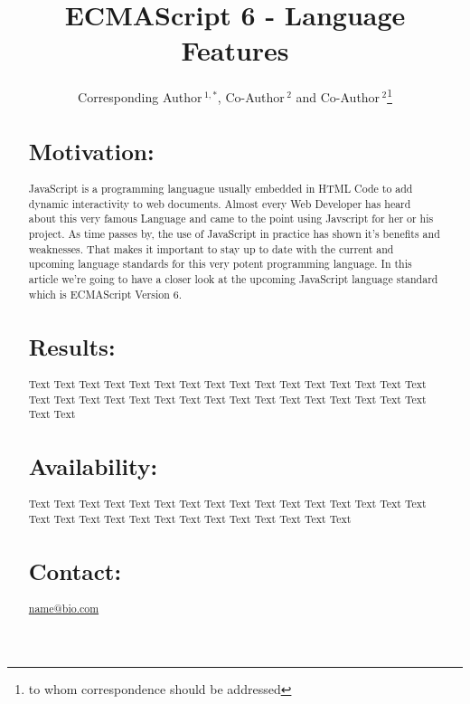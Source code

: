 \documentclass{bioinfo}
\begin{document}

\title[short Title]{ECMAScript 6 - Language Features}
\author[Sample \textit{et~al}]{Corresponding Author\,$^{1,*}$, Co-Author\,$^{2}$ and Co-Author\,$^2$\footnote{to whom correspondence should be addressed}}
\address{$^{1}$Department of XXXXXXX, Address XXXX etc.\\
$^{2}$Department of XXXXXXXX, Address XXXX etc.}



\maketitle

\begin{abstract}

\section{Motivation:}
JavaScript is a programming languague usually embedded in HTML Code to add dynamic interactivity to web documents. 
Almost every Web Developer has heard about this very famous Language and came to the point using Javscript for her or his project. 
As time passes by, the use of JavaScript in practice has shown it's benefits and weaknesses.
That makes it important to stay up to date with the current and upcoming language standards for this very potent programming language.  
In this article we're going to have a closer look at the upcoming JavaScript language standard which is ECMAScript Version 6.

\section{Results:}
Text  Text Text Text Text Text Text Text Text Text  Text Text Text Text Text Text Text Text Text  Text Text Text Text Text Text Text Text Text  Text Text Text Text Text Text

\section{Availability:}
Text  Text Text Text Text Text Text Text Text Text  Text Text Text Text Text Text Text Text Text  Text Text Text Text Text Text Text Text Text  Text

\section{Contact:} \href{name@bio.com}{name@bio.com}
\end{abstract}
\end{document}
